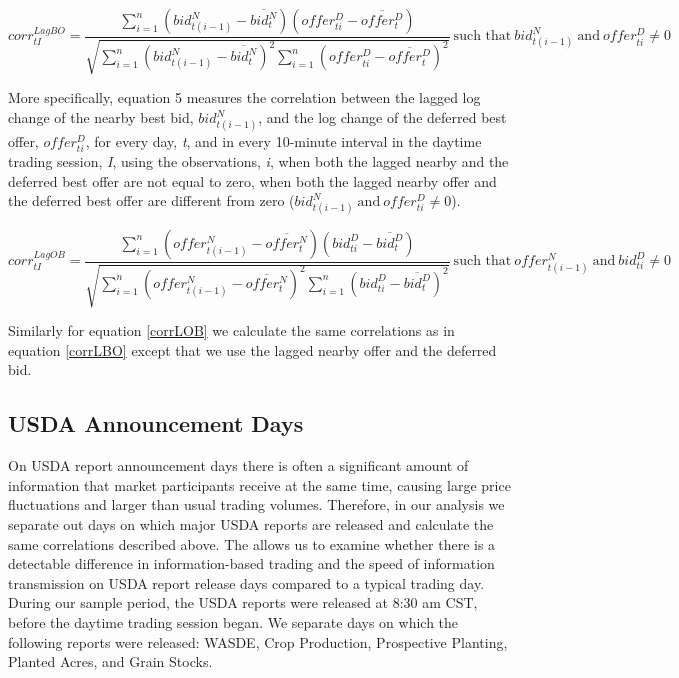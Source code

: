 \documentclass[review,12pt]{elsarticle}
\begin{document}
\begin{equation} \label{corrLBO}
corr^{LagBO}_{tI} = \frac{\sum\limits_{i=1}^{n} \left(bid_{t(i-1)}^N - \overline{bid_t^N}\right) \left(offer_{ti}^D - \overline{offer_t^D}\right)}{\sqrt{\sum\limits_{i=1}^{n} \left(bid_{t(i-1)}^N - \overline{bid_t^N}\right)^2 \sum\limits_{i=1}^{n}\left(offer_{ti}^D - \overline{offer_t^D}\right)^2}} \: \textrm{such that} \: {bid_{t(i-1)}^N \: \textrm{and} \: offer_{ti}^D} \neq 0
\end{equation}

More specifically, equation 5 measures the correlation between the
lagged log change of the nearby best bid, \(bid_{t(i-1)}^N\), and the
log change of the deferred best offer, \(offer_{ti}^D\), for every day,
\emph{t}, and in every 10-minute interval in the daytime trading
session, \emph{I}, using the observations, \emph{i}, when both the
lagged nearby and the deferred best offer are not equal to zero, when
both the lagged nearby offer and the deferred best offer are different
from zero (\({bid_{t(i-1)}^N \: \textrm{and} \: offer_{ti}^D} \neq 0\)).

\begin{equation} \label{corrLOB}
corr^{LagOB}_{tI} = \frac{\sum\limits_{i=1}^{n} \left(offer_{t(i-1)}^N - \overline{offer_t^N}\right) \left(bid_{ti}^D - \overline{bid_t^D}\right)}{\sqrt{\sum\limits_{i=1}^{n} \left(offer_{t(i-1)}^N - \overline{offer_t^N}\right)^2 \sum\limits_{i=1}^{n}\left(bid_{ti}^D - \overline{bid_t^D}\right)^2}} \: \textrm{such that} \: {offer_{t(i-1)}^N \: \textrm{and} \: bid_{ti}^D} \neq 0
\end{equation}

Similarly for equation \ref{corrLOB} we calculate the same correlations
as in equation \ref{corrLBO} except that we use the lagged nearby offer
and the deferred bid.

\subsection{USDA Announcement Days}\label{usda-announcement-days}

On USDA report announcement days there is often a significant amount of
information that market participants receive at the same time, causing
large price fluctuations and larger than usual trading volumes.
Therefore, in our analysis we separate out days on which major USDA
reports are released and calculate the same correlations described
above. The allows us to examine whether there is a detectable difference
in information-based trading and the speed of information transmission
on USDA report release days compared to a typical trading day. During
our sample period, the USDA reports were released at 8:30 am CST, before
the daytime trading session began. We separate days on which the
following reports were released: WASDE, Crop Production, Prospective
Planting, Planted Acres, and Grain Stocks.
\end{document}
